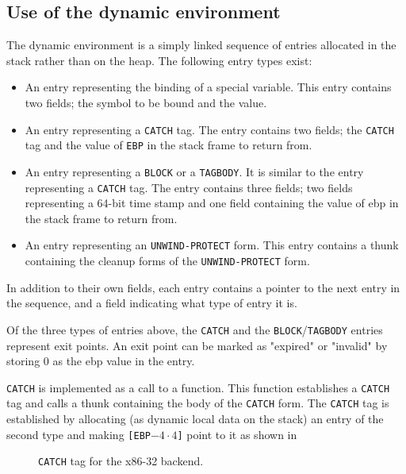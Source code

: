 \subsection{Use of the dynamic environment}

The dynamic environment is a simply linked sequence of entries
allocated in the stack rather than on the heap.  The following entry
types exist:

\begin{itemize}
  \item An entry representing the binding of a special variable.  This
    entry contains two fields; the symbol to be bound and the value.

  \item An entry representing a \texttt{CATCH} tag.  The entry
    contains two fields; the \texttt{CATCH} tag and the value of
    \texttt{EBP} in the stack frame to return from.

  \item An entry representing a \texttt{BLOCK} or a \texttt{TAGBODY}.
    It is similar to the entry representing a \texttt{CATCH} tag.  The
    entry contains three fields; two fields representing a 64-bit time
    stamp and one field containing the value of ebp in the stack frame
    to return from.

  \item An entry representing an \texttt{UNWIND-PROTECT} form.  This
    entry contains a thunk containing the cleanup forms of the
    \texttt{UNWIND-PROTECT} form.
\end{itemize}

In addition to their own fields, each entry contains a pointer to the
next entry in the sequence, and a field indicating what type of entry
it is.

Of the three types of entries above, the \texttt{CATCH} and the
\texttt{BLOCK}/\texttt{TAGBODY} entries represent exit points.  An
exit point can be marked as "expired" or "invalid" by storing 0 as the
ebp value in the entry.

\texttt{CATCH} is implemented as a call to a function.  This function
establishes a \texttt{CATCH} tag and calls a thunk containing the body
of the \texttt{CATCH} form.  The \texttt{CATCH} tag is established by
allocating (as dynamic local data on the stack) an entry of the second
type and making \texttt{[EBP$-4 \cdot 4$]} point to it as shown in 

\begin{figure}
\begin{center}
\end{center}
\caption{\label{fig-x86-32-catch}
\texttt{CATCH} tag for the x86-32 backend.}
\end{figure}

